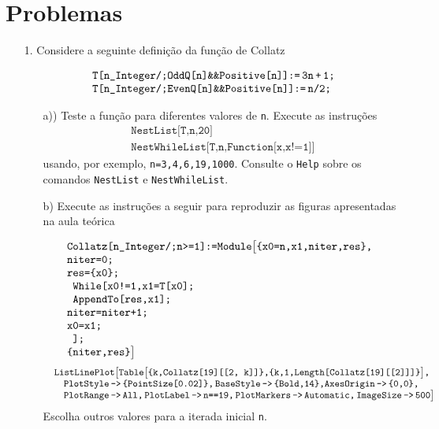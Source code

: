 \documentclass[11pt]{article}
\begin{document}
  
  \section{Problemas}   
  \begin{itemize}
  
  

\item[1.]    Considere a seguinte defini\c{c}\~ao da fun\c{c}\~ao de Collatz

 \[\begin{array}{l}
\texttt{T[n\textunderscore Integer/;OddQ[n]\&\&Positive[n]]:=\,3n\,+\,1;} \\ 
\texttt{T[n\_Integer/;EvenQ[n]\&\&Positive[n]]:=\,n/2;}
\end{array}
 \]
 
 \begin{itemize}
 
 \item[a))]
Teste a fun\c{c}\~ao para diferentes valores de \texttt{n}. Execute as instru\c{c}\~oes
 \[\begin{array}{l}
\texttt{NestList[T,n,20]}\\ 
\texttt{NestWhileList[T,n,Function[x,x!=1]]}
\end{array}
 \]
usando, por exemplo, \texttt{n=3,4,6,19,1000}.  Consulte o \texttt{Help} sobre os comandos \texttt{NestList} e \texttt{NestWhileList}. 




\item[b)]   Execute as instru\c{c}\~oes a seguir para  reproduzir as figuras apresentadas na aula te\'orica

 \[\begin{array}{l}
\texttt{Collatz[n\_Integer/;n>=1]:=Module\big[\{x0=n,x1,niter,res\}, }
\\
 \texttt{niter=0; }\\
 \texttt{res=\{x0\}; }\\ 
  \texttt{
  While[x0!=1,x1=T[x0]; } \\
  \texttt{
   AppendTo[res,x1]; } \\ 
   \texttt{niter=niter+1;}\\
 \texttt{x0=x1;}\\ 
 \texttt{ ];}\\ 
 \texttt{\{niter,res\}\big]}
\end{array}
 \]
  \[\begin{array}{l}
\texttt{  ListLinePlot\big[Table\big[\{k,Collatz[19][[2, k]]\},\{k,1,Length[Collatz[19][[2]]]\}\big], } \\ 
\quad  \texttt{
 PlotStyle\,->\,\{PointSize[0.02]\},\,BaseStyle\,->\,\{Bold,14\},}    \texttt{AxesOrigin\,->\,\{0,0\}, } \\
\quad \texttt{ 
 PlotRange\,->\,All,\,PlotLabel\,->\,n==19,\,PlotMarkers\,->\,Automatic,\,ImageSize\,->\,500}\big]
\end{array}
 \]
Escolha outros valores para a iterada inicial \texttt{n}.  
 




\end{itemize}
\end{itemize}
\end{document}
